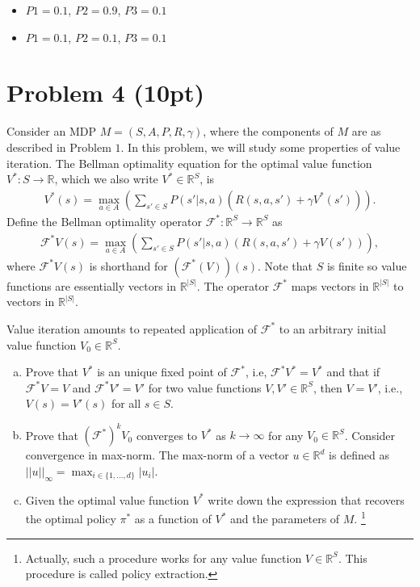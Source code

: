 \documentclass[12pt]{article}
\begin{document}
\begin{itemize}
\item $P1 = 0.1$, $P2 = 0.9$, $P3 = 0.1$
\item $P1 = 0.1$, $P2 = 0.1$, $P3 = 0.1$
\end{itemize}

\section*{Problem 4 (10pt)}

Consider an MDP $M = (S, A, P, R, \gamma)$, where the components of 
$M$ are as described in Problem $1$. In this problem, we will study some properties
of value iteration. The Bellman optimality equation for the 
optimal value function $V ^* : S \to \mathbb R$, 
which we also write $V ^* \in \mathbb R ^S$, is
\begin{align*}
  V ^*(s) = \max _{a \in A} 
    \left(
      \sum _{s' \in S} 
        P(s' | s, a) \left(
          R (s, a, s') + \gamma V ^*( s' )
        \right)
    \right) .
\end{align*}
Define the Bellman optimality operator 
$\mathcal F ^* : \mathbb R ^{ S } \to \mathbb R ^{ S }$ as 
\begin{align*}
  \mathcal F ^* V (s) 
    = \max _{a \in A} 
      \left(
        \sum _{s' \in S} 
          P(s' | s, a) \left(
            R (s, a, s') + \gamma V ( s' )
          \right)
      \right) ,
\end{align*}
where $\mathcal F ^* V (s)$ is shorthand for $( \mathcal F ^* ( V ) ) (s)$.
Note that $S$ is finite so value functions are essentially vectors in 
$\mathbb R ^{ |S| }$. The operator $\mathcal F ^*$ maps vectors in 
$\mathbb R ^{ |S| }$ to vectors in $\mathbb R ^{ |S| }$.

Value iteration amounts to repeated application of $\mathcal F ^*$ to an 
arbitrary initial value function $V _0 \in \mathbb R ^ { S }$. 
\begin{enumerate}[a)]
  \item Prove that $V ^*$ is an unique fixed point of $\mathcal F ^*$, i.e, 
    $\mathcal F ^* V ^* = V ^*$ and that if 
    $\mathcal F ^* V = V$ and $\mathcal F ^* V ' = V '$ 
    for two value functions $V, V' \in \mathbb R ^S$, 
    then $V = V'$, i.e., $V(s) = V'(s)$ for all $s \in S$.
  \item Prove that $(\mathcal F ^*) ^ k V _0$ converges to $V ^*$ as $k \to \infty$
    for any $V _0 \in \mathbb R ^ S$. 
    Consider convergence in max-norm. The max-norm of a vector 
    $u \in \mathbb R ^d $ is defined as  
    ${ || u || } _\infty = \max _{i \in \{1, \ldots, d \} }{ | u _i | }$. 
  \item Given the optimal value function $V ^*$ 
    write down the expression that recovers the optimal policy $\pi ^*$ as a 
    function of $V ^*$ and the parameters of $M$.
    \footnote{Actually, such a procedure works for any value function $V \in \mathbb R ^S$. 
    This procedure is called policy extraction.}
\end{enumerate}

\end{document}
